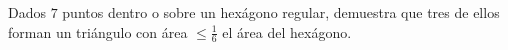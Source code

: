 Dados $7$ puntos dentro o sobre un hexágono regular, demuestra que tres de ellos forman un triángulo con área $\le \frac{1}{6}$ el área del hexágono. 
